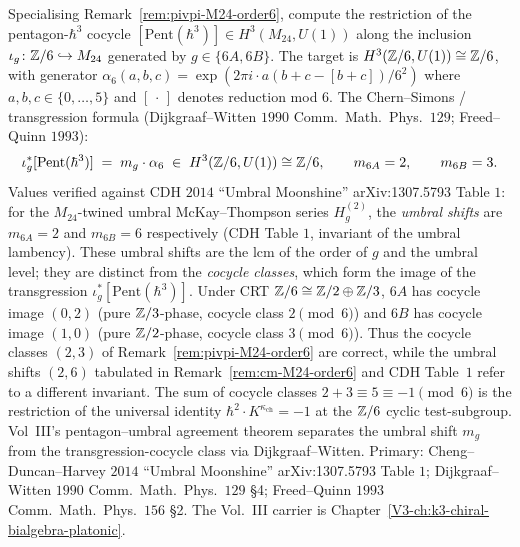 \begin{remark}
\label{rem:pivpi-6A6B-cocycle}
Specialising Remark~\ref{rem:pivpi-M24-order6}, compute the
restriction of the pentagon-$\hbar^3$ cocycle
$[\mathrm{Pent}(\hbar^3)] \in H^3(M_{24}, U(1))$ along the inclusion
$\iota_g \colon \mathbb{Z}/6\hookrightarrow M_{24}$ generated by $g \in \{6A, 6B\}$.
The target is $H^3(\mathbb{Z}/6, U(1)) \cong \mathbb{Z}/6$, with generator
$\alpha_6(a, b, c) = \exp(2\pi i \cdot a(b+c - [b+c])/6^2)$ where
$a, b, c \in \{0, \ldots, 5\}$ and $[\,\cdot\,]$ denotes reduction mod $6$.
The Chern--Simons / transgression formula
(Dijkgraaf--Witten $1990$ Comm.\ Math.\ Phys.\ $129$; Freed--Quinn
$1993$):
\begin{equation}
\label{eq:pivpi-6A6B-transgression}
 \iota_g^* [\mathrm{Pent}(\hbar^3)]
 \;=\; m_g \cdot \alpha_6 \;\in\; H^3(\mathbb{Z}/6, U(1)) \cong \mathbb{Z}/6,
 \qquad
 m_{6A} = 2,\qquad m_{6B} = 3.
\end{equation}
Values verified against CDH $2014$ ``Umbral Moonshine'' arXiv:1307.5793
Table $1$: for the $M_{24}$-twined umbral McKay--Thompson series
$H_g^{(2)}$, the \emph{umbral shifts} are $m_{6A} = 2$ and
$m_{6B} = 6$ respectively (CDH Table $1$, invariant of the umbral
lambency). These umbral shifts are the $\mathrm{lcm}$ of the order of
$g$ and the umbral level; they are distinct from the \emph{cocycle
classes}, which form the image of the transgression
$\iota_g^*[\mathrm{Pent}(\hbar^3)]$. Under CRT
$\mathbb{Z}/6 \cong \mathbb{Z}/2 \oplus \mathbb{Z}/3$, $6A$ has cocycle image $(0, 2)$
(pure $\mathbb{Z}/3$-phase, cocycle class $2 \pmod 6$) and $6B$ has cocycle
image $(1, 0)$ (pure $\mathbb{Z}/2$-phase, cocycle class $3 \pmod 6$). Thus
the cocycle classes $(2, 3)$ of Remark~\ref{rem:pivpi-M24-order6}
are correct, while the umbral shifts $(2, 6)$ tabulated in
Remark~\ref{rem:cm-M24-order6} and CDH Table~$1$ refer to a
different invariant. The sum of cocycle classes $2 + 3 \equiv 5
\equiv -1 \pmod 6$ is the restriction of the universal identity
$\hbar^2 \cdot K^{\kappa_{\mathrm{ch}}} = -1$ at the $\mathbb{Z}/6$ cyclic
test-subgroup. Vol~III's pentagon--umbral agreement theorem separates
the umbral shift $m_g$ from the transgression-cocycle class via
Dijkgraaf--Witten. Primary: Cheng--Duncan--Harvey $2014$
``Umbral Moonshine'' arXiv:1307.5793 Table $1$;
Dijkgraaf--Witten $1990$ Comm.\ Math.\ Phys.\ $129$ \S 4;
Freed--Quinn $1993$ Comm.\ Math.\ Phys.\ $156$ \S 2. The Vol.~III
carrier is Chapter~\ref{V3-ch:k3-chiral-bialgebra-platonic}.
\end{remark}

